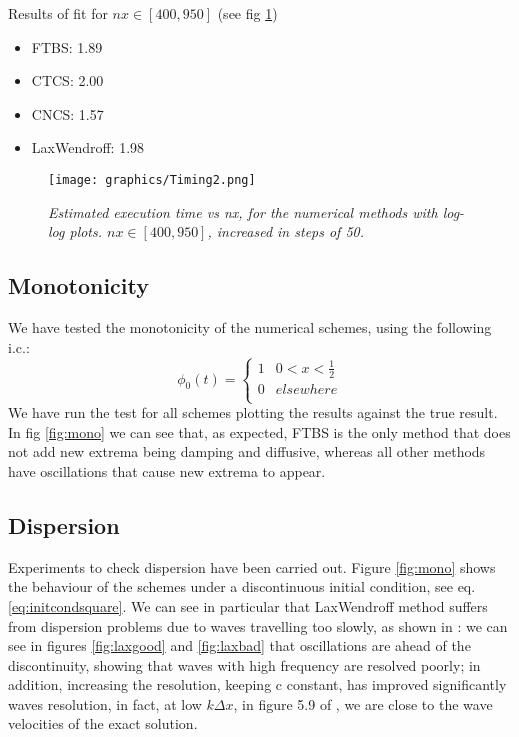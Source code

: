 Results of fit for $nx\in [400, 950]$ (see fig \ref{fig:timing2})
\begin{itemize}
\item FTBS: 1.89
\item CTCS: 2.00
\item CNCS: 1.57
\item LaxWendroff: 1.98
\end{itemize}

\begin{figure}[H]
	\begin{center}
		\texttt{[image: graphics/Timing2.png]}
	\end{center}%
	\caption[computational cost of numerical methods]{ \em Estimated execution time vs nx, for the numerical methods with log-log plots.  $nx\in [400, 950]$, increased in steps of 50.}
	\label{fig:timing2}
\end{figure}

\subsection{Monotonicity}
\label{sec:mono}
We have tested the monotonicity of the numerical schemes, using the following i.c.:
\begin{equation}
\phi_0(t)=\left\{
\begin{array}{lr}
1 & 0<x<\frac{1}{2} \\
0 &  elsewhere \\
\end{array}
\right.
\label{eq:initcondsquare}
\end{equation}
We have run the test for all schemes plotting the results against the true result. In fig \ref{fig:mono} we can see that, as expected, FTBS is the only method that does not add new extrema being damping and diffusive, whereas all other methods have oscillations that cause new extrema to appear.

\subsection{Dispersion}
Experiments to check dispersion have been carried out. Figure \ref{fig:mono} shows the behaviour of the schemes under a discontinuous initial condition, see eq. \ref{eq:initcondsquare}.
We can see in particular that LaxWendroff method suffers from dispersion problems due to waves travelling too slowly, as shown in \cite{mpebook}: we can see in figures \ref{fig:laxgood} and \ref{fig:laxbad} that oscillations are ahead of the discontinuity, showing that waves with high frequency are resolved poorly; in addition, increasing the resolution, keeping c constant, has improved significantly waves resolution, in fact, at low $k\Delta x$, in figure 5.9 of \cite{mpebook}, we are close to the wave velocities of the exact solution.


